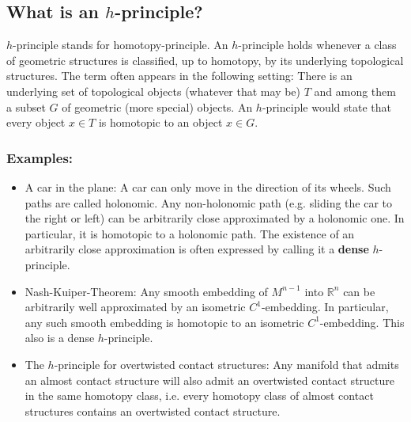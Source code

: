 
\subsection{What is an $h$-principle?}\label{sec:h_principle}
$h$-principle stands for homotopy-principle. 
An $h$-principle holds whenever a class of geometric structures is classified, up to homotopy, by its underlying topological structures.
The term often appears in the following setting: There is an underlying set of topological objects (whatever that may be) $T$
and among them a subset $G$ of geometric (more special) objects. An $h$-principle would state that every object $x \in T$ is homotopic to an object $x \in G$.

\subsubsection*{Examples:}
\begin{itemize}
    \item A car in the plane: A car can only move in the direction of its wheels. Such paths are called holonomic. Any non-holonomic path (e.g. sliding the car
    to the right or left) can be arbitrarily close approximated by a holonomic one. In particular, it is homotopic to a holonomic path.
    The existence of an arbitrarily close approximation is often expressed by calling it a \textbf{dense} $h$-principle.
    \item Nash-Kuiper-Theorem: Any smooth embedding of $M^{n-1}$ into $\mathbb R^n$ can be arbitrarily well approximated by an isometric $C^1$-embedding. 
    In particular, any such smooth embedding is homotopic to an isometric $C^1$-embedding. This also is a dense $h$-principle.
    \item The $h$-principle for overtwisted contact structures: Any manifold that admits an almost contact structure will also admit an overtwisted
    contact structure in the same homotopy class, i.e. every homotopy class of almost contact structures contains an overtwisted contact structure.
\end{itemize}


